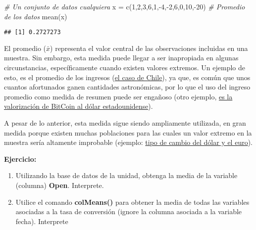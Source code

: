 \documentclass[
]{book}
\newenvironment{Shaded}{\begin{snugshade}}{\end{snugshade}}
\newcommand{\CommentTok}[1]{\textcolor[rgb]{0.56,0.35,0.01}{\textit{#1}}}
\newcommand{\DecValTok}[1]{\textcolor[rgb]{0.00,0.00,0.81}{#1}}
\newcommand{\FunctionTok}[1]{\textcolor[rgb]{0.00,0.00,0.00}{#1}}
\newcommand{\NormalTok}[1]{#1}
\newcommand{\OtherTok}[1]{\textcolor[rgb]{0.56,0.35,0.01}{#1}}
\newcommand{\SpecialCharTok}[1]{\textcolor[rgb]{0.00,0.00,0.00}{#1}}
\providecommand{\tightlist}{%
  \setlength{\itemsep}{0pt}\setlength{\parskip}{0pt}}
\begin{document}
\begin{Shaded}
\begin{Highlighting}[]
\CommentTok{\# Un conjunto de datos cualquiera}
\NormalTok{x }\OtherTok{=} \FunctionTok{c}\NormalTok{(}\DecValTok{1}\NormalTok{,}\DecValTok{2}\NormalTok{,}\DecValTok{3}\NormalTok{,}\DecValTok{6}\NormalTok{,}\DecValTok{1}\NormalTok{,}\SpecialCharTok{{-}}\DecValTok{4}\NormalTok{,}\SpecialCharTok{{-}}\DecValTok{2}\NormalTok{,}\DecValTok{6}\NormalTok{,}\DecValTok{0}\NormalTok{,}\DecValTok{10}\NormalTok{,}\SpecialCharTok{{-}}\DecValTok{20}\NormalTok{)}
\CommentTok{\# Promedio de los datos}
\FunctionTok{mean}\NormalTok{(x)}
\end{Highlighting}
\end{Shaded}

\begin{verbatim}
## [1] 0.2727273
\end{verbatim}

El promedio (\(\bar{x}\)) representa el valor central de las observaciones incluidas en una muestra. Sin embargo, esta medida puede llegar a ser inapropiada en algunas circunstancias, específicamente cuando existen valores extremos. Un ejemplo de esto, es el promedio de los ingresos (\href{https://www.ine.gob.cl/prensa/detalle-prensa/2022/07/21/el-ingreso-laboral-promedio-mensual-en-chile-fue-de-$681.039-en-2021\#:~:text=El\%20ingreso\%20laboral\%20promedio\%20mensual\%20en\%20Chile\%20fue\%20de\%20\%24681.039\%20en\%202021,-21\%2F07\%2F2022\&text=El\%2050\%25\%20de\%20las\%20personas,ingreso\%20de\%20hasta\%20\%24457.690\%20mensuales.}{el caso de Chile}), ya que, es común que unos cuantos afortunados ganen cantidades astronómicas, por lo que el uso del ingreso promedio como medida de resumen puede ser engañoso (otro ejemplo, \href{https://www.google.com/finance/quote/BTC-USD?sa=X\&ved=2ahUKEwi3po-_m9n8AhWUL7kGHTNFCfYQ-fUHegQIFhAe\&window=MAX}{es la valorización de BitCoin al dólar estadounidense}).

A pesar de lo anterior, esta medida sigue siendo ampliamente utilizada, en gran medida porque existen muchas poblaciones para las cuales un valor extremo en la muestra sería altamente improbable (ejemplo: \href{https://www.google.com/finance/quote/EUR-CLP?window=MAX\&comparison=USD-CLP}{tipo de cambio del dólar y el euro}).

\textbf{Ejercicio:}

\begin{enumerate}
\def\labelenumi{\arabic{enumi}.}
\tightlist
\item
  Utilizando la base de datos de la unidad, obtenga la media de la variable (columna) \textbf{Open}. Interprete.
\item
  Utilice el comando \textbf{colMeans()} para obtener la media de todas las variables asociadas a la tasa de conversión (ignore la columna asociada a la variable fecha). Interprete
\end{enumerate}
\end{document}

